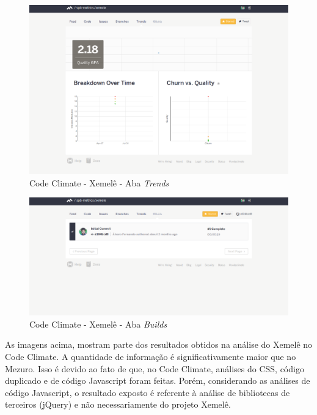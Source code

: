 \begin{figure}[!htb]
	\centering
    \includegraphics[keepaspectratio=true,scale=0.35]
    {figuras/codeclimate_trends_tab.eps}
  \caption{Code Climate - Xemelê - Aba \textit{Trends}}
	\label{fig:codeclimate_trends_tab}
\end{figure}

\begin{figure}[!htb]
	\centering
    \includegraphics[keepaspectratio=true,scale=0.35]
    {figuras/codeclimate_builds_tab.eps}
  \caption{Code Climate - Xemelê - Aba \textit{Builds}}
	\label{fig:codeclimate_builds_tab}
\end{figure}

As imagens acima, mostram parte dos resultados obtidos na análise do Xemelê no
Code Climate. A quantidade de informação é significativamente maior que no Mezuro.
Isso é devido ao fato de que, no Code Climate, análises do CSS, código duplicado
e de código Javascript foram feitas. Porém, considerando as análises de código
Javascript, o resultado exposto é referente à análise de bibliotecas de
terceiros (jQuery) e não necessariamente do projeto Xemelê.

